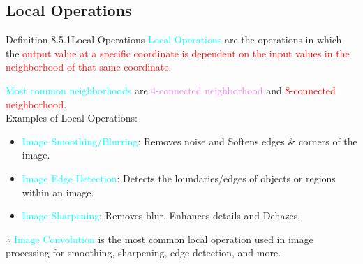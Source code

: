 \documentclass{book}
\begin{document}
\subsection{Local Operations}
\begin{defBox}{Definition 8.5.1}{Local Operations}
    \textcolor{cyan}{Local Operations} are the operations in which the \textcolor{red}{output value at a specific coordinate is dependent on the input values in the neighborhood of that same coordinate}.
\end{defBox}
\textcolor{cyan}{Most common neighborhoods} are \textcolor{violet}{4-connected neighborhood} and \textcolor{red}{8-connected neighborhood}.\\
Examples of Local Operations:
\begin{itemize}
    \item \textcolor{cyan}{Image Smoothing/Blurring}: Removes noise and Softens edges \& corners of the image.
    \item \textcolor{cyan}{Image Edge Detection}: Detects the loundaries/edges of objects or regions within an image.
    \item \textcolor{cyan}{Image Sharpening}: Removes blur, Enhances details and Dehazes.
\end{itemize}
$\therefore$ \textcolor{cyan}{Image Convolution} is the most common local operation used in image processing for smoothing, sharpening, edge detection, and more.
\end{document}
